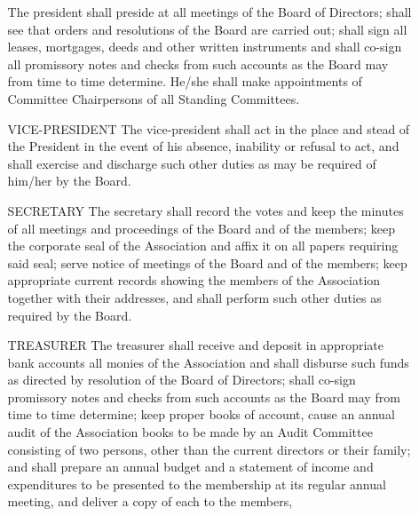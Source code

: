 \documentclass[12pt, letterpaper]{article}
\begin{document}
\begin{enumerate}
\begin{itemize}
    The president shall preside at all meetings of the Board of Directors; shall see that orders and resolutions of the Board are carried out; shall sign all leases, mortgages, deeds and other written instruments and shall co-sign all promissory notes and checks from such accounts as the Board may from time to time determine.
    He/she shall make appointments of Committee Chairpersons of all Standing Committees.
   \item[VICE-PRESIDENT]
    The vice-president shall act in the place and stead of the President in the event of his absence, inability or refusal to act, and shall exercise and discharge such other duties as may be required of him/her by the Board.
   \item[SECRETARY]
    The secretary shall record the votes and keep the minutes of all meetings and proceedings of the Board and of the members; keep the corporate seal of the Association and affix it on all papers requiring said seal; serve notice of meetings of the Board and of the members; keep appropriate current records showing the members of the Association together with their addresses, and shall perform such other duties as required by the Board.
   \item[TREASURER]
    The treasurer shall receive and deposit in appropriate bank accounts all monies of the Association and shall disburse such funds as directed by resolution of the Board of Directors; shall co-sign promissory notes and checks from such accounts as the Board may from time to time determine; keep proper books of account, cause an annual audit of the Association books to be made by an Audit Committee consisting of two persons, other than the current directors or their family; and shall prepare an annual budget and a statement of income and expenditures to be presented to the membership at its regular annual meeting, and deliver a copy of each to the members,
  \end{itemize}
\end{enumerate}

\end{document}
